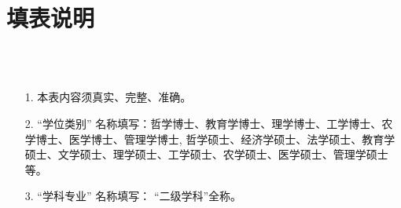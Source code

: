 \section*{填表说明}
~\\
~\\
\begin{itemize}[leftmargin=*]
\item[1.] 本表内容须真实、完整、准确。
\item[2.] “学位类别” 名称填写：哲学博士、教育学博士、理学博士、工学博士、农学博士、医学博士、管理学博士, 哲学硕士、经济学硕士、法学硕士、教育学硕士、文学硕士、理学硕士、工学硕士、农学硕士、医学硕士、管理学硕士等。
\item[3.] “学科专业” 名称填写： “二级学科”全称。
\end{itemize}
\newpage
